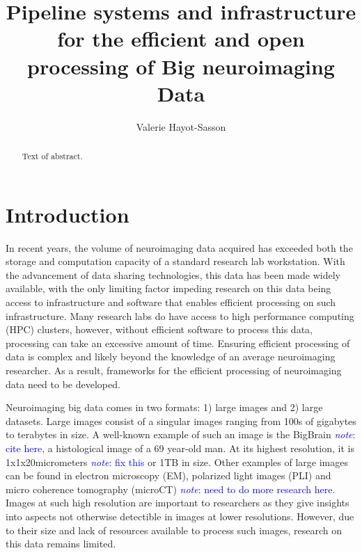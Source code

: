 \documentclass{report}
\newcommand{\note}[1]{\textcolor{blue}{\textit{note}: #1}}
\begin{document}
 
    \title{Pipeline systems and infrastructure for the efficient
            and open processing of Big neuroimaging Data} 
    \author{Valerie Hayot-Sasson}
    \maketitle 
    
    \begin{abstract} Text of abstract.  
    \end{abstract} 
    \tableofcontents
    \chapter{Introduction}
    In recent years, the volume of neuroimaging data acquired has exceeded
    both the storage and computation capacity of a standard research 
    lab workstation. With the advancement of data sharing technologies, this 
    data has been made widely available, with the only limiting factor impeding
    research on this data being access to infrastructure and software that 
    enables efficient processing on such infrastructure. Many research labs do
    have access to high performance computing (HPC) clusters, however, without
    efficient software to process this data, processing can take an excessive 
    amount of time. Ensuring efficient processing of data is complex and 
    likely beyond the knowledge of an average neuroimaging researcher. As a 
    result, frameworks for the efficient processing of neuroimaging data need
    to be developed.

    Neuroimaging big data comes in two formats: 1) large images and 2) large 
    datasets. Large images consist of a singular images ranging from 100s of
    gigabytes to terabytes in size. A well-known example of such an image is the
    BigBrain \note{cite here}, a histological image of a 69 year-old man. 
    At its highest resolution, it is 1x1x20micrometers \note{fix this} or 1TB in
    size. Other examples of large images can be found in electron microscopy 
    (EM), polarized light images (PLI) and micro coherence tomography (microCT)
    \note{need to do more research here}. Images at such high resolution are
    important to researchers as they give insights into aspects not otherwise
    detectible in images at lower resolutions. However, due to their size and 
    lack of resources available to process such images, research on this data 
    remains limited.
\end{document}
